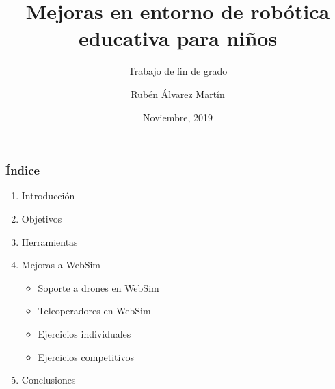 \documentclass[xcolor={table}]{beamer}
\title{Mejoras en entorno de robótica  educativa para niños}
\subtitle{Trabajo de fin de grado}
\author{Rubén Álvarez Martín}
\date{Noviembre, 2019}
\begin{document}
	\setcounter{showProgressBar}{0}
	\setcounter{showSlideNumbers}{0}

	\frame{\titlepage}

	\begin{frame}
		\frametitle{Índice}
		\begin{enumerate}
			\item Introducción  \textcolor{ExecusharesGrey}{}
		 \textcolor{ExecusharesGrey}{\footnotesize\hspace{0.5em}}
 		\item Objetivos  \textcolor{ExecusharesGrey}{}
		 \textcolor{ExecusharesGrey}{\footnotesize\hspace{0.5em}}
			\item Herramientas  \textcolor{ExecusharesGrey}{\footnotesize\hspace{0.5em}}
			\item Mejoras a WebSim  \textcolor{ExecusharesGrey}{
			\begin{itemize}
			    \item Soporte a drones en WebSim
			    \item Teleoperadores en WebSim
			    \item Ejercicios individuales
			    \item Ejercicios competitivos
			\end{itemize}} 
			\item Conclusiones  \textcolor{ExecusharesGrey}{\footnotesize\hspace{0.5em}}
		\end{enumerate}
	\end{frame}

	\setcounter{framenumber}{0}
	\setcounter{showProgressBar}{1}
	\setcounter{showSlideNumbers}{1}
\end{document}
